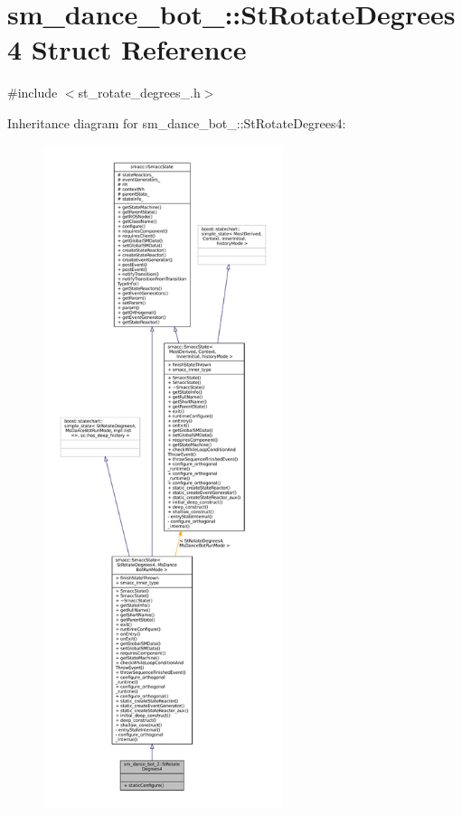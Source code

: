 \hypertarget{structsm__dance__bot__2_1_1StRotateDegrees4}{}\section{sm\+\_\+dance\+\_\+bot\+\_\+:\+:St\+Rotate\+Degrees4 Struct Reference}
\label{structsm__dance__bot__2_1_1StRotateDegrees4}


{\ttfamily \#include $<$st\+\_\+rotate\+\_\+degrees\+\_.\+h$>$}



Inheritance diagram for sm\+\_\+dance\+\_\+bot\+\_\+:\+:St\+Rotate\+Degrees4\+:
\nopagebreak
\begin{figure}[H]
\begin{center}
\leavevmode
\includegraphics[height=550pt]{structsm__dance__bot__2_1_1StRotateDegrees4__inherit__graph}
\end{center}
\end{figure}


